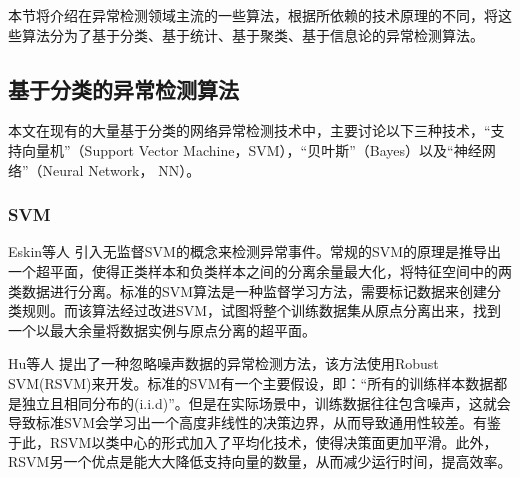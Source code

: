 本节将介绍在异常检测领域主流的一些算法，根据所依赖的技术原理的不同，将这些算法分为了基于分类、基于统计、基于聚类、基于信息论的异常检测算法。

\subsection{基于分类的异常检测算法}



本文在现有的大量基于分类的网络异常检测技术中，主要讨论以下三种技术，“支持向量机”（Support Vector Machine，SVM），“贝叶斯”（Bayes）以及“神经网络”（Neural Network， NN）。

\subsubsection{SVM}
Eskin等人\cite{2002AEskin} 引入无监督SVM的概念来检测异常事件。常规的SVM的原理是推导出一个超平面，使得正类样本和负类样本之间的分离余量最大化，将特征空间中的两类数据进行分离。标准的SVM算法是一种监督学习方法，需要标记数据来创建分类规则。而该算法经过改进SVM，试图将整个训练数据集从原点分离出来，找到一个以最大余量将数据实例与原点分离的超平面。

Hu等人\cite{Hu2003Robust} 提出了一种忽略噪声数据的异常检测方法，该方法使用Robust SVM(RSVM)来开发。标准的SVM有一个主要假设，即：“所有的训练样本数据都是独立且相同分布的(i.i.d)”。但是在实际场景中，训练数据往往包含噪声，这就会导致标准SVM会学习出一个高度非线性的决策边界，从而导致通用性较差。有鉴于此，RSVM以类中心的形式加入了平均化技术，使得决策面更加平滑。此外，RSVM另一个优点是能大大降低支持向量的数量，从而减少运行时间，提高效率。

